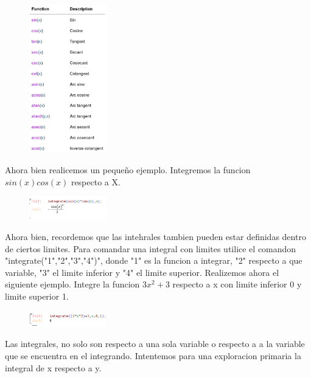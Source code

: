 \documentclass[a4paper]{article}
\begin{document}
\begin{figure}[ht!]
\centering
\includegraphics[width=0.3\textwidth]{2.png}
\caption{\label{fig:}}
\end{figure}

Ahora bien realicemos un pequeño ejemplo. Integremos la funcion $sin(x)cos(x)$ respecto a X.

\begin{figure}[ht!]
\centering
\includegraphics[width=0.3\textwidth]{3.png}
\caption{\label{fig:}}
\end{figure}

Ahora bien, recordemos que las intehrales tambien pueden estar definidas dentro de ciertos limites. Para comandar una integral con limites utilice el comandon "integrate("1","2","3","4")", donde "1" es la funcion a integrar, "2" respecto a que variable, "3" el limite inferior y "4" el limite superior. 
\linebreak
Realizemos ahora el siguiente ejemplo. Integre la funcion $3x^2+3$ respecto a x con limite inferior 0 y limite superior 1.

\begin{figure}[ht!]
\centering
\includegraphics[width=0.3\textwidth]{4.png}
\caption{\label{fig:}}
\end{figure}

Las integrales, no solo son respecto a una sola variable o respecto a a la variable que se encuentra en el integrando. Intentemos para una exploracion primaria la integral de x respecto a y.
\end{document}
